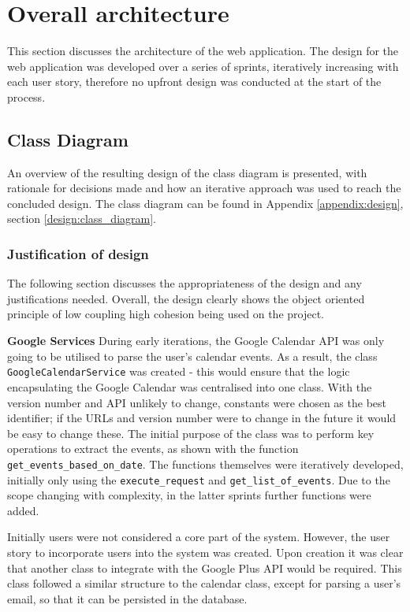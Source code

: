 \section{Overall architecture}
This section discusses the architecture of the web application. The design for the web application was developed over a series of sprints, iteratively increasing with each user story, therefore no upfront design was conducted at the start of the process.

\subsection{Class Diagram}
\label{architecture:class}
An overview of the resulting design of the class diagram is presented, with rationale for decisions made and how an iterative approach was used to reach the concluded design. The class diagram can be found in Appendix \ref{appendix:design}, section \ref{design:class_diagram}.

\subsubsection{Justification of design}
The following section discusses the appropriateness of the design and any justifications needed. Overall, the design clearly shows the object oriented principle of low coupling high cohesion being used on the project.

\noindent
\textbf{Google Services}
\newline
During early iterations, the Google Calendar API was only going to be utilised to parse the user's calendar events. As a result, the class \texttt{GoogleCalendarService} was created - this would ensure that the logic encapsulating the Google Calendar was centralised into one class. With the version number and API unlikely to change, constants were chosen as the best identifier; if the URLs and version number were to change in the future it would be easy to change these. The initial purpose of the class was to perform key operations to extract the events, as shown with the function \texttt{get\_events\_based\_on\_date}. The functions themselves were iteratively developed, initially only using the \texttt{execute\_request} and \texttt{get\_list\_of\_events}. Due to the scope changing with complexity, in the latter sprints  further functions were added.

Initially users were not considered a core part of the system. However, the user story to incorporate users into the system was created. Upon creation it was clear that another class to integrate with the Google Plus API would be required. This class followed a similar structure to the calendar class, except for parsing a user's email, so that it can be persisted in the database.

